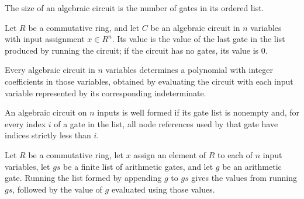 \begin{definition}
\label{Randomized.AlgCircuit.size}
\leanok
{}
The size of an algebraic circuit is the number of gates in its ordered list.
\end{definition}

\begin{definition}
\label{Randomized.AlgCircuit.eval}
\leanok
{}
Let $R$ be a commutative ring, and let $C$ be an algebraic circuit in $n$ variables with
input assignment $x\in R^n$. Its value is the value of the last gate in the list
produced by running the circuit; if the circuit has no gates, its value is $0$.
\end{definition}

\begin{definition}
\label{Randomized.AlgCircuit.toMvPolynomial}
\leanok
{}
Every algebraic circuit in $n$ variables determines a polynomial with integer
coefficients in those variables, obtained by evaluating the circuit with each input
variable represented by its corresponding indeterminate.
\end{definition}

\begin{definition}
\label{Randomized.AlgCircuit.WellFormed}
\leanok
{}
An algebraic circuit on $n$ inputs is well formed if its gate list is nonempty and, for
every index $i$ of a gate in the list, all node references used by that gate have
indices strictly less than $i$.
\end{definition}

\begin{theorem}
\label{Randomized.AlgCircuit.run_append_singleton}
\leanok
{}
Let $R$ be a commutative ring, let $x$ assign an element of $R$ to each of $n$ input
variables, let $gs$ be a finite list of arithmetic gates, and let $g$ be an arithmetic
gate. Running the list formed by appending $g$ to $gs$ gives the values from running
$gs$, followed by the value of $g$ evaluated using those values.
\end{theorem}

